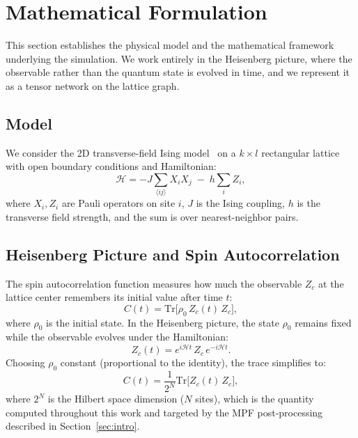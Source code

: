 \documentclass[11pt]{article}
\newcommand{\ham}{\mathcal{H}}
\begin{document}
\section{Mathematical Formulation}
\label{sec:physics}

This section establishes the physical model and the mathematical framework
underlying the simulation. We work entirely in the Heisenberg picture, where
the observable rather than the quantum state is evolved in time, and we
represent it as a tensor network on the lattice graph.

\subsection{Model}

We consider the 2D transverse-field Ising model~\citep{sachdev2011quantum} on a
$k \times l$ rectangular lattice with open boundary conditions and Hamiltonian:
\begin{equation}
 \ham = -J \sum_{\langle ij \rangle} X_i X_j \;-\; h \sum_i Z_i,
 \label{eq:hamiltonian}
\end{equation}
where $X_i, Z_i$ are Pauli operators on site $i$, $J$ is the Ising coupling,
$h$ is the transverse field strength, and the sum is over nearest-neighbor pairs.

\subsection{Heisenberg Picture and Spin Autocorrelation}

The spin autocorrelation function measures how much the observable $Z_c$
at the lattice center remembers its initial value after time $t$:
\begin{equation}
 C(t) = \mathrm{Tr}\bigl[\rho_0\, Z_c(t)\, Z_c\bigr],
 \label{eq:autocorr_general}
\end{equation}
where $\rho_0$ is the initial state.
In the Heisenberg picture, the state $\rho_0$ remains fixed while the
observable evolves under the Hamiltonian:
\begin{equation}
 Z_c(t) = e^{i\ham t}\, Z_c\, e^{-i\ham t}.
 \label{eq:heisenberg}
\end{equation}
Choosing $\rho_0$ constant (proportional to the identity), the trace
simplifies to:
\begin{equation}
 C(t) = \frac{1}{2^N} \mathrm{Tr}\bigl[ Z_c(t)\, Z_c \bigr],
 \label{eq:autocorr}
\end{equation}
where $2^N$ is the Hilbert space dimension ($N$ sites),
which is the quantity computed throughout this work and targeted by the
MPF post-processing described in Section~\ref{sec:intro}.
\end{document}

